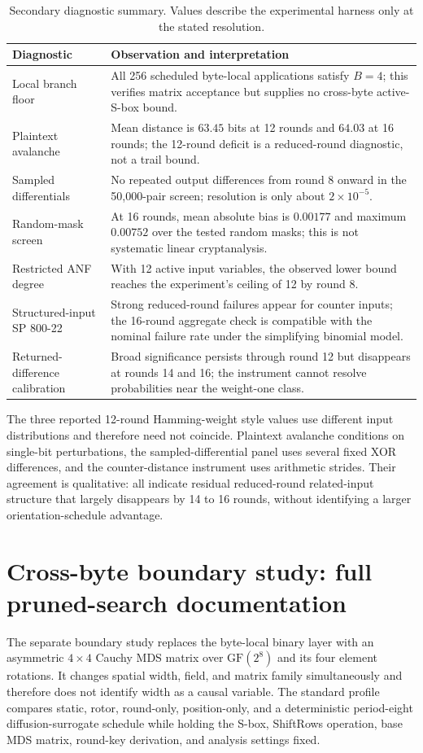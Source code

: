 \documentclass[cryptography,supfile,submit,oneauthor]{Definitions/mdpi}
\newcommand{\GF}{\mathrm{GF}}
\begin{document}
\begin{table}[h]
\centering\small
\caption{Secondary diagnostic summary. Values describe the experimental harness only at the stated resolution.}
\begin{tabular}{p{}p{}}
\toprule
Diagnostic & Observation and interpretation\\
\midrule
Local branch floor & All 256 scheduled byte-local applications satisfy $B=4$; this verifies matrix acceptance but supplies no cross-byte active-S-box bound.\\
Plaintext avalanche & Mean distance is $63.45$ bits at 12 rounds and $64.03$ at 16 rounds; the 12-round deficit is a reduced-round diagnostic, not a trail bound.\\
Sampled differentials & No repeated output differences from round 8 onward in the 50,000-pair screen; resolution is only about $2\times10^{-5}$.\\
Random-mask screen & At 16 rounds, mean absolute bias is $0.00177$ and maximum $0.00752$ over the tested random masks; this is not systematic linear cryptanalysis.\\
Restricted ANF degree & With 12 active input variables, the observed lower bound reaches the experiment's ceiling of 12 by round 8.\\
Structured-input SP 800-22 & Strong reduced-round failures appear for counter inputs; the 16-round aggregate check is compatible with the nominal failure rate under the simplifying binomial model.\\
Returned-difference calibration & Broad significance persists through round 12 but disappears at rounds 14 and 16; the instrument cannot resolve probabilities near the weight-one class.\\
\bottomrule
\end{tabular}
\end{table}

The three reported 12-round Hamming-weight style values use different input distributions and therefore need not coincide. Plaintext avalanche conditions on single-bit perturbations, the sampled-differential panel uses several fixed XOR differences, and the counter-distance instrument uses arithmetic strides. Their agreement is qualitative: all indicate residual reduced-round related-input structure that largely disappears by 14 to 16 rounds, without identifying a larger orientation-schedule advantage.

\section{Cross-byte boundary study: full pruned-search documentation}
The separate boundary study replaces the byte-local binary layer with an asymmetric $4\times4$ Cauchy MDS matrix over $\GF(2^8)$ and its four element rotations. It changes spatial width, field, and matrix family simultaneously and therefore does not identify width as a causal variable. The standard profile compares static, rotor, round-only, position-only, and a deterministic period-eight diffusion-surrogate schedule while holding the S-box, ShiftRows operation, base MDS matrix, round-key derivation, and analysis settings fixed.
\end{document}
